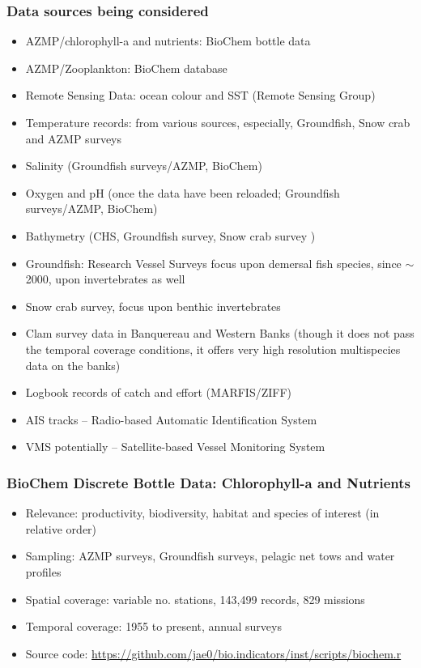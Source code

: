 \documentclass{beamer}
\numberwithin{equation}{section}		%
\numberwithin{figure}{section}		%
\numberwithin{table}{section}				%
\begin{document}
\begin{frame}[shrink]
  \frametitle{Data sources being considered}
\begin{itemize}
	\item AZMP/chlorophyll-a and nutrients: BioChem bottle data 
  \item AZMP/Zooplankton: BioChem database 
  \item Remote Sensing Data: ocean colour and SST (Remote Sensing Group)
  \item Temperature records: from various sources, especially, Groundfish, Snow crab and AZMP surveys
  \item Salinity (Groundfish surveys/AZMP, BioChem)
  \item Oxygen and pH (once the data have been reloaded; Groundfish surveys/AZMP, BioChem)
  \item Bathymetry (CHS, Groundfish survey, Snow crab survey )
  \item Groundfish: Research Vessel Surveys focus upon demersal fish species, since $\sim$ 2000, upon invertebrates as well
  \item Snow crab survey, focus upon benthic invertebrates
  \item Clam survey data in Banquereau and Western Banks (though it does not pass the temporal coverage conditions, it offers very high resolution multispecies data on the banks)
  \item Logbook records of catch and effort (MARFIS/ZIFF)
  \item AIS tracks -- Radio-based Automatic Identification System
  \item VMS potentially -- Satellite-based Vessel Monitoring System
\end{itemize}
    
\end{frame}



\begin{frame}
  \frametitle{BioChem Discrete Bottle Data: Chlorophyll-a and Nutrients}
\begin{itemize}
  \item Relevance: productivity, biodiversity, habitat and species of interest (in relative order)
  \item Sampling: AZMP surveys, Groundfish surveys, pelagic net tows and water profiles
  \item Spatial coverage: variable no. stations, 143,499 records, 829 missions
  \item Temporal coverage: 1955 to present, annual surveys
  \item Source code: \url{https://github.com/jae0/bio.indicators/inst/scripts/biochem.r}
\end{itemize}
\end{frame}
\end{document}
